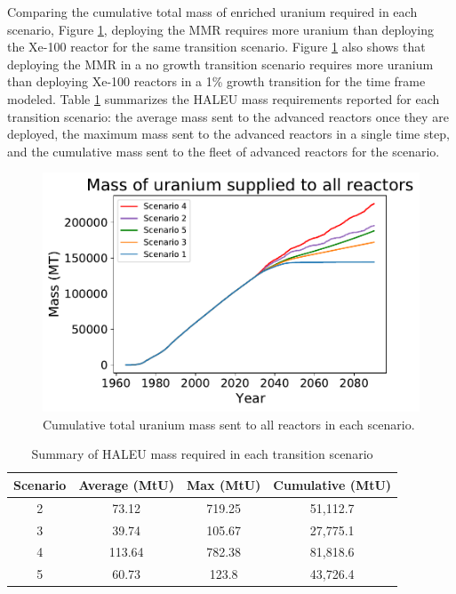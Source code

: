 Comparing the cumulative total mass of enriched uranium required in each scenario, 
Figure \ref{fig:cumulativeU_all}, deploying the \gls{MMR} 
requires more uranium than deploying the Xe-100 reactor for the same 
transition scenario. Figure \ref{fig:cumulativeU_all} also shows that 
deploying the \gls{MMR} in a no growth transition 
scenario requires more uranium than deploying Xe-100 reactors in a 1\% 
growth transition for the time frame modeled. Table \ref{tab:U_summary} summarizes 
the \gls{HALEU} mass 
requirements reported for each transition scenario: the average mass sent to 
the advanced reactors once they are deployed, the maximum mass sent to the 
advanced reactors in a single time step, and the cumulative mass sent to the 
fleet of advanced reactors for the scenario. 

\begin{figure}
    \centering 
    \includegraphics[scale=0.4]{../figures/fuelsupplytotal_scenarios_all.pdf}
    \caption{Cumulative total uranium mass sent to all reactors in each scenario.}
    \label{fig:cumulativeU_all}
\end{figure}


\begin{table}
    \centering
    \caption{Summary of \gls{HALEU} mass required in each transition scenario}
    \label{tab:U_summary}
    \begin{tabular}{c c c c}
        \hline
        Scenario & Average (MtU) & Max (MtU) & Cumulative (MtU) \\\hline
        2 & 73.12 & 719.25 & 51,112.7 \\
        3 & 39.74 & 105.67 & 27,775.1 \\
        4 & 113.64 & 782.38 & 81,818.6 \\
        5 & 60.73 & 123.8 & 43,726.4 
        \\\hline       
    \end{tabular}
\end{table}

